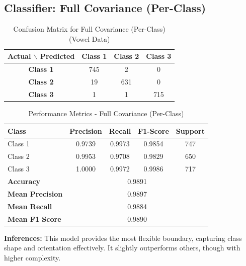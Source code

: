 \subsection{Classifier: Full Covariance (Per-Class)}


\begin{table}[H]
\centering
\caption{Confusion Matrix for Full Covariance (Per-Class) (Vowel Data)}
\label{tab:confmat_d3_sigma2I}
\begin{tabular}{|c|c|c|c|}
\hline
\textbf{Actual $\backslash$ Predicted} & \textbf{Class 1} & \textbf{Class 2} & \textbf{Class 3} \\
\hline
\textbf{Class 1} & 745 & 2   & 0   \\
\textbf{Class 2} & 19  & 631 & 0   \\
\textbf{Class 3} & 1   & 1   & 715 \\
\hline
\end{tabular}
\end{table}

\begin{table}[H]
\centering
\caption{Performance Metrics - Full Covariance (Per-Class)}
\begin{tabular}{lcccc}
\toprule
\textbf{Class} & \textbf{Precision} & \textbf{Recall} & \textbf{F1-Score} & \textbf{Support} \\
\midrule
Class 1 & 0.9739 & 0.9973 & 0.9854 & 747 \\
Class 2 & 0.9953 & 0.9708 & 0.9829 & 650 \\
Class 3 & 1.0000 & 0.9972 & 0.9986 & 717 \\
\midrule
\textbf{Accuracy} & \multicolumn{4}{c}{0.9891} \\
\textbf{Mean Precision} & \multicolumn{4}{c}{0.9897} \\
\textbf{Mean Recall} & \multicolumn{4}{c}{0.9884} \\
\textbf{Mean F1 Score} & \multicolumn{4}{c}{0.9890} \\
\bottomrule
\end{tabular}
\end{table}

\textbf{Inferences:} This model provides the most flexible boundary, capturing class shape and orientation effectively. It slightly outperforms others, though with higher complexity.

